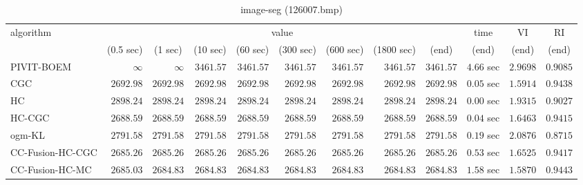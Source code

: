 \begin{table}[H]
\scriptsize
\centering
\caption{image-seg (126007.bmp)}
\label{tab:anytimetable-image-seg-126007.bmp}
\begin{tabular}{lrrrrrrrrrrr}
\toprule
           algorithm &                                   \multicolumn{8}{c}{value} & \multicolumn{1}{c}{time}    & \multicolumn{1}{c}{VI}  & \multicolumn{1}{c}{RI} \\  
\cmidrule(lr){2-9}\cmidrule(lr){10-10} \cmidrule(lr){11-11} \cmidrule(lr){12-12}   
                     & \multicolumn{1}{c}{(0.5 sec)} & \multicolumn{1}{c}{(1 sec)} & \multicolumn{1}{c}{(10 sec)} & \multicolumn{1}{c}{(60 sec)} & \multicolumn{1}{c}{(300 sec)} & \multicolumn{1}{c}{(600 sec)} & \multicolumn{1}{c}{(1800 sec)} & \multicolumn{1}{c}{(end)} & \multicolumn{1}{c}{(end)}    & \multicolumn{1}{c}{(end)}   & \multicolumn{1}{c}{(end)}  \\ \midrule 
          PIVIT-BOEM & $\infty$ & $\infty$ & $      3461.57$ & $      3461.57$ & $      3461.57$ & $      3461.57$ & $      3461.57$ & $      3461.57$ & $         4.66$ sec    & $       2.9698$  & $       0.9085$ \\ 
                 CGC & $      2692.98$ & $      2692.98$ & $      2692.98$ & $      2692.98$ & $      2692.98$ & $      2692.98$ & $      2692.98$ & $      2692.98$ & $         0.05$ sec    & $       1.5914$  & $       0.9438$ \\ 
                  HC & $      2898.24$ & $      2898.24$ & $      2898.24$ & $      2898.24$ & $      2898.24$ & $      2898.24$ & $      2898.24$ & $      2898.24$ & $         0.00$ sec    & $       1.9315$  & $       0.9027$ \\ 
              HC-CGC & $      2688.59$ & $      2688.59$ & $      2688.59$ & $      2688.59$ & $      2688.59$ & $      2688.59$ & $      2688.59$ & $      2688.59$ & $         0.04$ sec    & $       1.6463$  & $       0.9415$ \\ 
              ogm-KL & $      2791.58$ & $      2791.58$ & $      2791.58$ & $      2791.58$ & $      2791.58$ & $      2791.58$ & $      2791.58$ & $      2791.58$ & $         0.19$ sec    & $       2.0876$  & $       0.8715$ \\ 
    CC-Fusion-HC-CGC & $      2685.26$ & $      2685.26$ & $      2685.26$ & $      2685.26$ & $      2685.26$ & $      2685.26$ & $      2685.26$ & $      2685.26$ & $         0.53$ sec    & $       1.6525$  & $       0.9417$ \\ 
     CC-Fusion-HC-MC & $      2685.03$ & $      2684.83$ & $      2684.83$ & $      2684.83$ & $      2684.83$ & $      2684.83$ & $      2684.83$ & $      2684.83$ & $         1.58$ sec    & $       1.5870$  & $       0.9443$ \\ 

\end{tabular}
\end{table}
